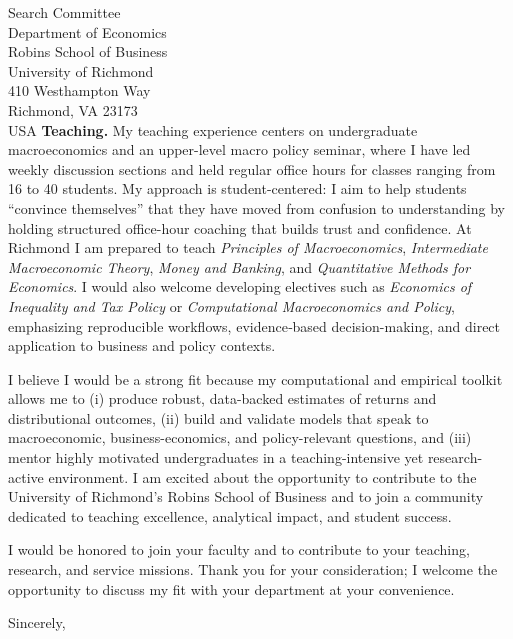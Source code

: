 \documentclass[11pt,letterpaper]{letter}
\begin{document}
\begin{letter}{Search Committee \\
Department of Economics \\
Robins School of Business \\
University of Richmond \\
410 Westhampton Way \\
Richmond, VA 23173 \\ USA}
\textbf{Teaching.} My teaching experience centers on undergraduate macroeconomics and an upper-level macro policy seminar, where I have led weekly discussion sections and held regular office hours for classes ranging from 16 to 40 students. My approach is student-centered: I aim to help students “convince themselves” that they have moved from confusion to understanding by holding structured office-hour coaching that builds trust and confidence. At Richmond I am prepared to teach \textit{Principles of Macroeconomics}, \textit{Intermediate Macroeconomic Theory}, \textit{Money and Banking}, and \textit{Quantitative Methods for Economics}. I would also welcome developing electives such as \textit{Economics of Inequality and Tax Policy} or \textit{Computational Macroeconomics and Policy}, emphasizing reproducible workflows, evidence‐based decision-making, and direct application to business and policy contexts.

I believe I would be a strong fit because my computational and empirical toolkit allows me to (i) produce robust, data-backed estimates of returns and distributional outcomes, (ii) build and validate models that speak to macroeconomic, business-economics, and policy-relevant questions, and (iii) mentor highly motivated undergraduates in a teaching-intensive yet research-active environment. I am excited about the opportunity to contribute to the University of Richmond’s Robins School of Business and to join a community dedicated to teaching excellence, analytical impact, and student success.

I would be honored to join your faculty and to contribute to your teaching, research, and service missions. Thank you for your consideration; I welcome the opportunity to discuss my fit with your department at your convenience.

\closing{Sincerely,}

\end{letter}
\end{document}
